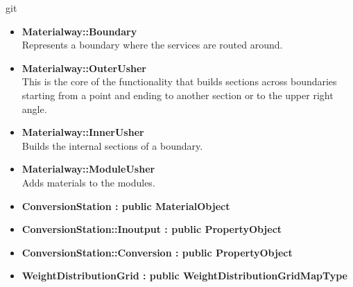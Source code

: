 git\documentclass[12pt, a4paper]{article}
\begin{document}
\begin{itemize}
\item \textbf{Materialway::Boundary}\\
Represents a boundary where the services are routed around.

\item \textbf{Materialway::OuterUsher}\\
This is the core of the functionality that builds sections across boundaries starting from a point and ending to another section or to the upper right angle.

\item \textbf{Materialway::InnerUsher}\\
Builds the internal sections of a boundary.

\item \textbf{Materialway::ModuleUsher}\\
Adds materials to the modules.

\item \textbf{ConversionStation : public MaterialObject}
\item \textbf{ConversionStation::Inoutput : public PropertyObject}
\item \textbf{ConversionStation::Conversion : public PropertyObject}
\item \textbf{WeightDistributionGrid : public WeightDistributionGridMapType}

\end{itemize}
\end{document}
